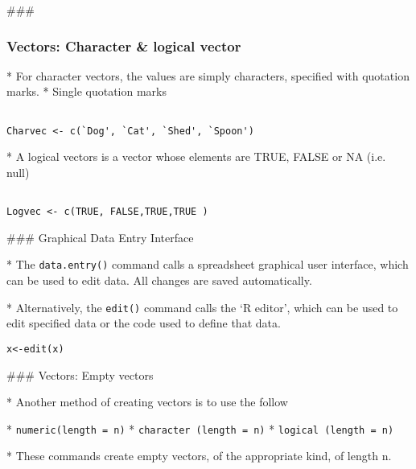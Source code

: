 \begin{frame}[fragile]
\begin{itemize}
### 
\frametitle{Vectors: Character \& logical vector}


*  For character vectors, the values are simply characters,
specified with quotation marks.
*  Single quotation marks
\begin{framed}
\begin{verbatim}

Charvec <- c(`Dog', `Cat', `Shed', `Spoon')

\end{verbatim}
\end{framed}

*  A logical vectors is a vector whose elements are TRUE, FALSE
or NA (i.e. null)

\begin{framed}
\begin{verbatim}

Logvec <- c(TRUE, FALSE,TRUE,TRUE )

\end{verbatim}
\end{framed}



### {Graphical Data Entry Interface}


*  The \texttt{data.entry()} command calls a spreadsheet graphical user
interface, which can be used to edit data. All changes are saved
automatically.




*  Alternatively, the \texttt{edit()} command calls the `R editor',
which can be used to edit specified data or the code used to
define that data.

\begin{verbatim}
x<-edit(x)
\end{verbatim}






### {Vectors: Empty vectors}


*  Another method of creating vectors is to use the follow


*  \texttt{numeric(length = n)} 
*  \texttt{character (length = n)} 
*  \texttt{logical (length = n)}


*  These commands create empty vectors, of the appropriate
kind, of length n.


\end{itemize}
\end{frame}
